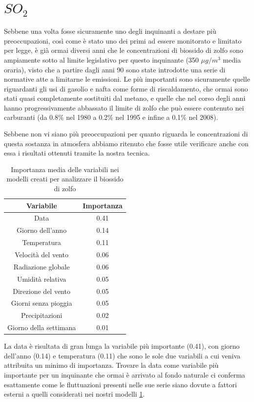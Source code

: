 \section{$SO_2$}
Sebbene una volta fosse sicuramente uno degli inquinanti a destare più preoccupazioni, così come è stato uno dei primi ad essere monitorato e limitato per legge, è già ormai diversi anni che le concentrazioni di biossido di zolfo sono ampiamente sotto al limite legislativo per questo inquinante (350 $\mu g/m^3$ media oraria), visto che a partire dagli anni 90 sono state introdotte una serie di normative atte a limitarne le emissioni. Le più importanti sono sicuramente quelle riguardanti gli usi di gasolio e nafta come forme di riscaldamento, che ormai sono stati quasi
completamente sostituiti dal metano, e quelle che nel corso degli anni hanno progressivamente abbassato il limite di zolfo che può essere contenuto nei carburanti (da 0.8\% nel 1980 a 0.2\% nel 1995 e infine a 0.1\% nel 2008).

Sebbene non vi siano più preoccupazioni per quanto riguarda le concentrazioni di questa sostanza in atmosfera abbiamo ritenuto che fosse utile verificare anche con essa i risultati ottenuti tramite la nostra tecnica. 

\begin{table}[h!]
\centering
\begin{tabular}{ |c c| }
	\hline
	Variabile & Importanza \\
	\hline
	Data & 0.41 \\
	Giorno dell'anno & 0.14 \\
	Temperatura & 0.11 \\
	Velocità del vento & 0.06 \\
	Radiazione globale & 0.06 \\
	Umidità relativa & 0.05 \\
	Direzione del vento & 0.05 \\
	Giorni senza pioggia & 0.05 \\
	Precipitazioni & 0.02 \\
	Giorno della settimana & 0.01 \\
	\hline
\end{tabular}
\caption{Importanza media delle variabili nei modelli creati per analizzare il biossido di zolfo}
\label{table:importanza_so2}
\end{table}

La data è risultata di gran lunga la variabile più importante (0.41), con giorno dell'anno (0.14) e temperatura (0.11) che sono le sole due variabili a cui veniva attribuita un minimo di importanza. Trovare la data come variabile più importante per un inquinante che ormai è arrivato al fondo naturale ci conferma esattamente come le fluttuazioni presenti nelle sue serie siano dovute a fattori esterni a quelli considerati nei nostri modelli \ref{table:importanza_so2}.

